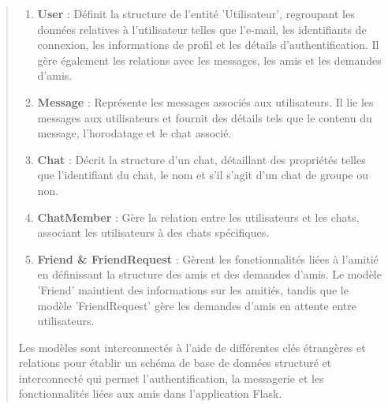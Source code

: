 \documentclass{article}
\begin{document}
\begin{quote}
\begin{enumerate}
    \vspace*{1\baselineskip}
    \item \textbf{User} : Définit la structure de l'entité 'Utilisateur', regroupant les données relatives à l'utilisateur telles que l'e-mail, les identifiants de connexion, les informations de profil et les détails d'authentification. Il gère également les relations avec les messages, les amis et les demandes d'amis.
    \vspace*{1\baselineskip}
    \item \textbf{Message} : Représente les messages associés aux utilisateurs. Il lie les messages aux utilisateurs et fournit des détails tels que le contenu du message, l'horodatage et le chat associé.
    \vspace*{1\baselineskip}
    \item \textbf{Chat} : Décrit la structure d'un chat, détaillant des propriétés telles que l'identifiant du chat, le nom et s'il s'agit d'un chat de groupe ou non.
    \vspace*{1\baselineskip}
    \item \textbf{ChatMember} : Gère la relation entre les utilisateurs et les chats, associant les utilisateurs à des chats spécifiques.
    \vspace*{1\baselineskip}
    \item \textbf{Friend \& FriendRequest} : Gèrent les fonctionnalités liées à l'amitié en définissant la structure des amis et des demandes d'amis. Le modèle 'Friend' maintient des informations sur les amitiés, tandis que le modèle 'FriendRequest' gère les demandes d'amis en attente entre utilisateurs.
\end{enumerate}
Les modèles sont interconnectés à l'aide de différentes clés étrangères et relations pour établir un schéma de base de données structuré et interconnecté qui permet l'authentification, la messagerie et les fonctionnalités liées aux amis dans l'application Flask.

\end{quote}
\end{document}
